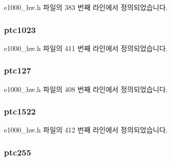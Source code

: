 e1000\+\_\+hw.\+h 파일의 383 번째 라인에서 정의되었습니다.

\subsubsection[{\texorpdfstring{ptc1023}{ptc1023}}]{ ptc1023}\hypertarget{structe1000__hw__stats_a4b11e51e69f500f159723e887018cf98}{}\label{structe1000__hw__stats_a4b11e51e69f500f159723e887018cf98}


e1000\+\_\+hw.\+h 파일의 411 번째 라인에서 정의되었습니다.

\subsubsection[{\texorpdfstring{ptc127}{ptc127}}]{ ptc127}\hypertarget{structe1000__hw__stats_a7056c7143f22f703c1985389907e50de}{}\label{structe1000__hw__stats_a7056c7143f22f703c1985389907e50de}


e1000\+\_\+hw.\+h 파일의 408 번째 라인에서 정의되었습니다.

\subsubsection[{\texorpdfstring{ptc1522}{ptc1522}}]{ ptc1522}\hypertarget{structe1000__hw__stats_a0f233feaecf72e7fd6c40330aec0f1b2}{}\label{structe1000__hw__stats_a0f233feaecf72e7fd6c40330aec0f1b2}


e1000\+\_\+hw.\+h 파일의 412 번째 라인에서 정의되었습니다.

\subsubsection[{\texorpdfstring{ptc255}{ptc255}}]{ ptc255}\hypertarget{structe1000__hw__stats_aa6bebbf9ef188b96372a047e09288709}{}\label{structe1000__hw__stats_aa6bebbf9ef188b96372a047e09288709}


